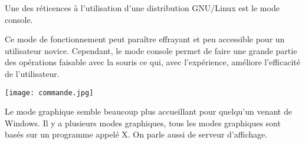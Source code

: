 \begin{minipage}[c]{.49\linewidth}
Une des réticences à l'utilisation d'une distribution GNU/Linux est le mode console. 

Ce mode de fonctionnement peut paraître effrayant et peu accessible pour un utilisateur novice. Cependant, le mode console permet de faire une grande partie des opérations faisable avec la souris ce qui, avec l'expérience, améliore l'efficacité de l'utilisateur.
\end{minipage} \hfill
\begin{minipage}[c]{.49\linewidth}
\begin{center}
\texttt{[image: commande.jpg]}
\end{center}
\end{minipage}
%
%


\vspace{.25cm}

Le mode graphique semble beaucoup plus accueillant pour quelqu'un venant de Windows. 
Il y a plusieurs modes graphiques, tous les modes graphiques sont basés sur un programme appelé X. On parle aussi de serveur d'affichage.

